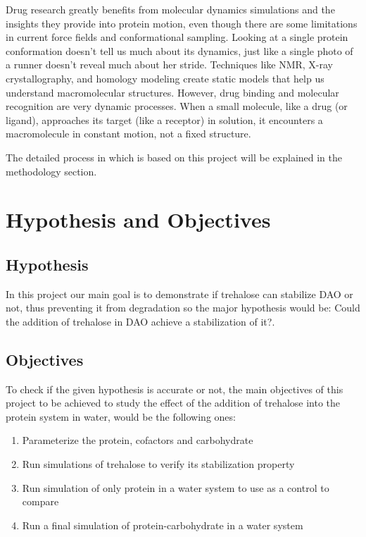 \documentclass[12pt,twoside]{article}
\begin{document}
Drug research greatly benefits from molecular dynamics simulations and the insights they provide into protein motion, even though there are some limitations in current force fields and conformational sampling. Looking at a single protein conformation doesn't tell us much about its dynamics, just like a single photo of a runner doesn't reveal much about her stride. Techniques like NMR, X-ray crystallography, and homology modeling create static models that help us understand macromolecular structures. However, drug binding and molecular recognition are very dynamic processes. When a small molecule, like a drug (or ligand), approaches its target (like a receptor) in solution, it encounters a macromolecule in constant motion, not a fixed structure.

The detailed process in which is based on this project will be explained in the methodology section.

\clearpage
\section{Hypothesis and Objectives}


\subsection{Hypothesis}


In this project our main goal is to demonstrate if trehalose can stabilize DAO or not, thus preventing it from degradation so the major hypothesis would be:
Could the addition of trehalose in DAO achieve a stabilization of it?.


\subsection{Objectives}

To check if the given hypothesis is accurate or not, the main objectives of this project to be achieved to study the effect of the addition of trehalose into the protein system in water, would be the following ones:

\begin{enumerate}
    \item Parameterize the protein, cofactors and 
    carbohydrate
    \item Run simulations of trehalose to verify its
    stabilization property
    \item Run simulation of only protein in a water
    system to use as a control to compare
    \item Run a final simulation of protein-carbohydrate
    in a water system
\end{enumerate}
\end{document}
